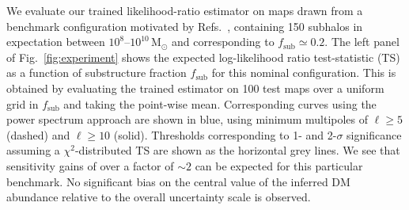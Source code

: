\documentclass[]{article}
\begin{document}
We evaluate our trained likelihood-ratio estimator on maps drawn from a benchmark configuration motivated by Refs.~\cite{Hutten:2016jko,Springel:2008cc}, containing 150 subhalos in expectation between $10^{8}$--$10^{10}\,\mathrm{M}_\odot$ and corresponding to $f_\mathrm{sub} \simeq 0.2$. The left panel of Fig.~\ref{fig:experiment} shows the expected log-likelihood ratio test-statistic (TS) as a function of substructure fraction $f_\mathrm{sub}$ for this nominal configuration. This is obtained by evaluating the trained estimator on 100 test maps over a uniform grid in $f_\mathrm{sub}$ and taking the point-wise mean. Corresponding curves using the power spectrum approach are shown in blue, using minimum multipoles of $\ell \geq 5$ (dashed) and $\ell \geq 10$ (solid). Thresholds corresponding to 1- and 2-$\sigma$ significance assuming a $\chi^2$-distributed TS are shown as the horizontal grey lines. We see that sensitivity gains of over a factor of $\sim 2$ can be expected for this particular benchmark. No significant bias on the central value of the inferred DM abundance relative to the overall uncertainty scale is observed.
\end{document}
